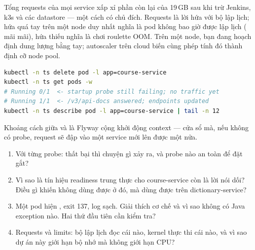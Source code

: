 \begin{hardware}
Tổng requests của mọi service xấp xỉ phần còn lại của 19\,GB sau khi
trừ Jenkins, k3s và các datastore --- một cách có chủ đích. Requests là
lời hứa với bộ lập lịch; hứa quá tay trên một node duy nhất nghĩa là pod
không bao giờ được lập lịch ( mãi mãi), hứa thiếu nghĩa là
chơi roulette OOM. Trên một node, bạn đang hoạch định dung lượng bằng
tay; autoscaler trên cloud biến cùng phép tính đó thành định cỡ node
pool.
\end{hardware}

\begin{handson}
\begin{lstlisting}[language=bash]
kubectl -n ts delete pod -l app=course-service
kubectl -n ts get pods -w
# Running 0/1  <- startup probe still failing; no traffic yet
# Running 1/1  <- /v3/api-docs answered; endpoints updated
kubectl -n ts describe pod -l app=course-service | tail -n 12
\end{lstlisting}
Khoảng cách giữa  và  là Flyway cộng khởi động
context --- cửa sổ mà, nếu không có probe, request sẽ đập vào một
service mới lên được một nửa.
\end{handson}

\begin{quiz}
\begin{enumerate}
  \item Với từng probe: thất bại thì chuyện gì xảy ra, và probe nào an
  toàn để đặt gắt?
  \item Vì sao  là tín hiệu readiness trung thực cho
  course-service còn  là lời nói dối? Điều gì
  khiến  không dùng được ở đó, mà dùng được trên
  dictionary-service?
  \item Một pod hiện , exit 137, log sạch. Giải thích
  cơ chế và vì sao không có Java exception nào. Hai thứ đầu tiên cần
  kiểm tra?
  \item Requests và limits: bộ lập lịch đọc cái nào, kernel thực thi
  cái nào, và vì sao dự án này giới hạn bộ nhớ mà không giới hạn
  CPU?
\end{enumerate}
\end{quiz}
